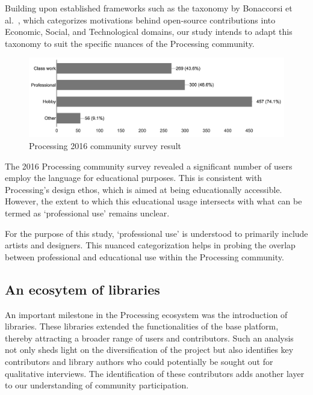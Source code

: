 Building upon established frameworks such as the taxonomy by Bonaccorsi et al.~\cite{bonaccorsiComparingMotivationsIndividual2006}, which categorizes motivations behind open-source contributions into Economic, Social, and Technological domains, our study intends to adapt this taxonomy to suit the specific nuances of the Processing community.

\begin{figure}[h!]
	\centering
	\includegraphics[width=\textwidth]{images/community-survey.png}
	\caption{Processing 2016 community survey result \parencite{2016CommunitySurvey}}
	\label{fig:community_survey}
\end{figure}
The 2016 Processing community survey revealed a significant number of users employ the language for educational purposes. This is consistent with Processing's design ethos, which is aimed at being educationally accessible. However, the extent to which this educational usage intersects with what can be termed as `professional use' remains unclear.

For the purpose of this study, `professional use' is understood to primarily include artists and designers. This nuanced categorization helps in probing the overlap between professional and educational use within the Processing community.

\subsection{An ecosytem of libraries}
An important milestone in the Processing ecosystem was the introduction of libraries. These libraries extended the functionalities of the base platform, thereby attracting a broader range of users and contributors. Such an analysis not only sheds light on the diversification of the project but also identifies key contributors and library authors who could potentially be sought out for qualitative interviews. The identification of these contributors adds another layer to our understanding of community participation.

